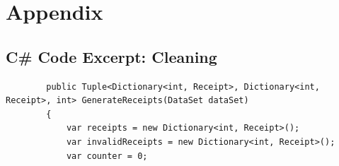 \documentclass{article}
\begin{document}

\newpage

    \section{Appendix}
    \label{sec:Appendix}

    \subsection{C\# Code Excerpt: Cleaning}
    \label{sec:sharpccleaning}
    \lstset{style=sharpc}
    \begin{lstlisting}
        public Tuple<Dictionary<int, Receipt>, Dictionary<int, Receipt>, int> GenerateReceipts(DataSet dataSet)
        {
            var receipts = new Dictionary<int, Receipt>();
            var invalidReceipts = new Dictionary<int, Receipt>();
            var counter = 0;


\end{lstlisting}
\end{document}
